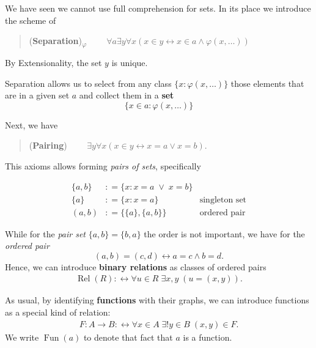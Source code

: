 \documentclass{article}
\newcommand{\Op}[1]{\operatorname{#1}}
\begin{document}
We have seen we cannot use full comprehension for sets. In its place we introduce the scheme of

\begin{quote}
(\textbf{Separation})\textsubscript{$\varphi$} $\qquad  \forall a \exists y \forall x (x \in y \leftrightarrow x \in a \wedge \varphi(x,\ldots))$
\end{quote}

By Extensionality, the set $y$ is unique.

Separation allows us to select from any class $\{x \colon \varphi(x,\ldots)\}$ those elements that are in a given set $a$ and collect them in a \textbf{set}
\begin{equation*}
\{x \in a \colon \varphi(x,\ldots)\}
\end{equation*}

Next, we have

\begin{quote}
(\textbf{Pairing}) $\qquad \exists y \forall x( x \in y \leftrightarrow  x = a \vee x = b)$.
\end{quote}

This axioms allows forming \textit{pairs of sets}, specifically

\begin{align*}
    \{a,b\} & : =  \{x\colon x=a \; \vee \; x=b \} &    \\
    \{a\} &: = \{x\colon x=a  \} &    \text{singleton set}\\
    (a,b) &: =  \{\{a\},\{a,b\}\} &    \text{ordered pair}
\end{align*}

While for the \textit{pair set} $\{a,b\} = \{b,a\}$ the order is not important, we have for the \textit{ordered pair}
\begin{equation*}
(a,b) = (c,d) \leftrightarrow a = c \wedge b = d.
\end{equation*}
Hence, we can introduce \textbf{binary relations} as classes of ordered pairs
\begin{gather*}
    \Op{Rel}(R) :\leftrightarrow  \forall u \in R \; \exists x,y  \; (u =(x,y)).
\end{gather*}

As usual, by identifying \textbf{functions} with their graphs, we can introduce functions as a special kind of relation:
\begin{gather*}
F: A \to B :\leftrightarrow  \forall x \in A \; \exists ! y \in B \; (x,y) \in F.
\end{gather*}
We write $\Op{Fun}(a)$ to denote that fact that $a$ is a function.
\end{document}
